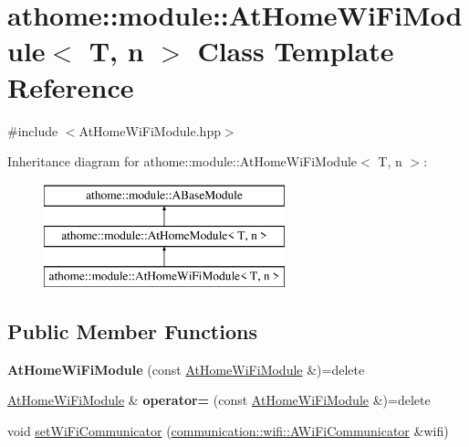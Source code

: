 \hypertarget{classathome_1_1module_1_1_at_home_wi_fi_module}{}\section{athome\+:\+:module\+:\+:At\+Home\+Wi\+Fi\+Module$<$ T, n $>$ Class Template Reference}
\label{classathome_1_1module_1_1_at_home_wi_fi_module}


{\ttfamily \#include $<$At\+Home\+Wi\+Fi\+Module.\+hpp$>$}

Inheritance diagram for athome\+:\+:module\+:\+:At\+Home\+Wi\+Fi\+Module$<$ T, n $>$\+:\begin{figure}[H]
\begin{center}
\leavevmode
\includegraphics[height=3.000000cm]{classathome_1_1module_1_1_at_home_wi_fi_module}
\end{center}
\end{figure}
\subsection*{Public Member Functions}
\begin{DoxyCompactItemize}
\item 
\mbox{\label{classathome_1_1module_1_1_at_home_wi_fi_module_af414ddecde14c57564ccff7ad898b3a0}} 
{\bfseries At\+Home\+Wi\+Fi\+Module} (const \mbox{\hyperlink{classathome_1_1module_1_1_at_home_wi_fi_module}{At\+Home\+Wi\+Fi\+Module}} \&)=delete
\item 
\mbox{\label{classathome_1_1module_1_1_at_home_wi_fi_module_af3338d83bd96103f7a3a86d5495eb465}} 
\mbox{\hyperlink{classathome_1_1module_1_1_at_home_wi_fi_module}{At\+Home\+Wi\+Fi\+Module}} \& {\bfseries operator=} (const \mbox{\hyperlink{classathome_1_1module_1_1_at_home_wi_fi_module}{At\+Home\+Wi\+Fi\+Module}} \&)=delete
\item 
void \mbox{\hyperlink{classathome_1_1module_1_1_at_home_wi_fi_module_a610d2e99c11fdd4b6afbfe65ee2e56d5}{set\+Wi\+Fi\+Communicator}} (\mbox{\hyperlink{classathome_1_1communication_1_1wifi_1_1_a_wi_fi_communicator}{communication\+::wifi\+::\+A\+Wi\+Fi\+Communicator}} \&wifi)
\end{DoxyCompactItemize}
